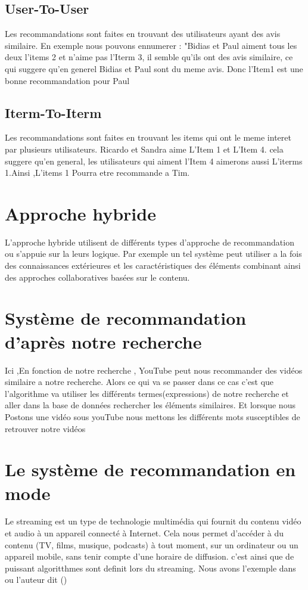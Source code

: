 \documentclass[12pt,a4paper]{article}
\begin{document}
\subsection{User-To-User}
Les recommandations sont faites en trouvant des utilisateurs ayant des avis similaire. En exemple nous pouvons ennumerer : "Bidias et Paul aiment tous les deux l'items 2 et n'aime pas l'Iterm 3, il semble qu'ils ont des avis similaire, ce qui suggere qu'en generel Bidias et Paul sont du meme avis. Donc l'Item1 est une bonne recommandation pour Paul
\subsection{Iterm-To-Iterm}
Les recommandations sont faites en trouvant les items qui ont le meme interet par plusieurs utilisateurs. Ricardo et Sandra aime L'Item 1 et L'Item 4. cela suggere qu'en general, les utilisateurs qui aiment l'Item 4 aimerons aussi L'iterms 1.Ainsi ,L'items 1 Pourra etre recommande a Tim. 
\section{Approche hybride}
L'approche hybride utilisent de différents types d'approche de recommandation ou s'appuie sur la leurs logique. Par exemple un tel système peut utiliser a la fois des connaissances extérieures et les caractéristiques des éléments combinant ainsi des approches collaboratives basées sur le contenu.	
\section{Système de recommandation d'après notre recherche}
Ici ,En fonction de notre recherche , YouTube peut nous recommander des vidéos similaire a notre
recherche. Alors ce qui va se passer dans ce cas c'est que l'algorithme va utiliser les différents termes(expressions) de notre recherche et aller
dans la base de données rechercher les éléments similaires. Et lorsque nous Postons une vidéo sous youTube nous mettons les différents mots 
susceptibles de retrouver notre vidéos 

\section{Le système de recommandation en mode }
Le streaming est un type de technologie multimédia qui fournit du contenu vidéo et audio à un appareil connecté à Internet. Cela nous permet d'accéder à du contenu (TV, films, musique, podcasts) à tout moment, sur un ordinateur ou un appareil mobile, sans tenir compte d'une horaire de diffusion. c'est ainsi que de puissant algoritthmes sont definit lors du streaming. Nous avons l'exemple dans       \cite{benbouzid2020cadran} ou l'auteur dit ()




\end{document}
